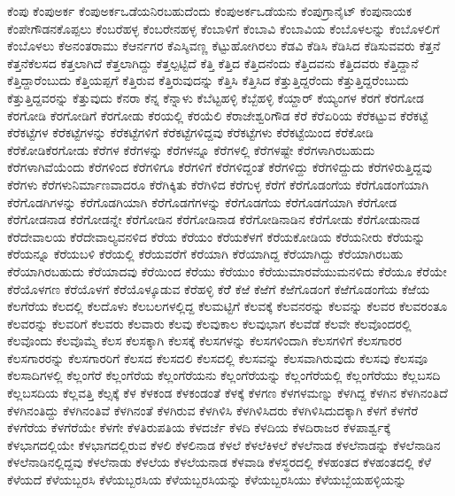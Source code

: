 {ಕೆಂಪು
ಕೆಂಪುಅರ್ಕ
ಕೆಂಪುಅರ್ಕಒಡೆಯನಿರಬಹುದೆಂದು
ಕೆಂಪುಅರ್ಕಒಡೆಯನು
ಕೆಂಪುಗ್ರಾನೈಟ್
ಕೆಂಪುನಾಯಕ
ಕೆಂಪೇಗೌಡನಕೊಪ್ಪಲು
ಕೆಂಬರೆಹಳ್ಳ
ಕೆಂಬರೇನಹಳ್ಳ
ಕೆಂಬಾಳಿಗೆ
ಕೆಂಬಾವಿ
ಕೆಂಬಾವಿಯ
ಕೆಂಬೊಳಲನ್ನು
ಕೆಂಬೊಳಲಿಗೆ
ಕೆಂಬೊಳಲು
ಕೆಅನಂತರಾಮು
ಕೆಆರ್ನಗರ
ಕೆಎಸ್ಶಿವಣ್ಣ
ಕೆಟ್ಟುಹೋಗಿರಲು
ಕೆಡವಿ
ಕೆಡಿಸಿ
ಕೆಡಿಸಿದ
ಕೆಡಿಸುವವರು
ಕೆತ್ತನೆ
ಕೆತ್ತನೆಕೆಲಸದ
ಕೆತ್ತಲಾಗಿದೆ
ಕೆತ್ತಲಾಗಿದ್ದು
ಕೆತ್ತಲ್ಪಟ್ಟಿದೆ
ಕೆತ್ತಿ
ಕೆತ್ತಿದ
ಕೆತ್ತಿದನೆಂದು
ಕೆತ್ತಿದವನು
ಕೆತ್ತಿದವರು
ಕೆತ್ತಿದ್ದಾನೆ
ಕೆತ್ತಿದ್ದಾರೆಂಬುದು
ಕೆತ್ತಿಯಪ್ಪಗೆ
ಕೆತ್ತಿರುವ
ಕೆತ್ತಿರುವುದನ್ನು
ಕೆತ್ತಿಸಿ
ಕೆತ್ತಿಸಿದ
ಕೆತ್ತುತ್ತಿದ್ದರೆಂದು
ಕೆತ್ತುತ್ತಿದ್ದರೆಂಬುದು
ಕೆತ್ತುತ್ತಿದ್ದವರನ್ನು
ಕೆತ್ತುವುದು
ಕೆನರಾ
ಕೆನ್ನ
ಕೆನ್ನಾಳು
ಕೆಬೆಟ್ಟಹಳ್ಳಿ
ಕೆಬ್ಬೆಹಳ್ಳಿ
ಕೆಯ್ದಾರ್
ಕೆಯ್ಯಂಗಳ
ಕೆರಗೆ
ಕೆರಗೋಡ
ಕೆರಗೋಡಿ
ಕೆರಗೋಡಿಗೆ
ಕೆರಗೋಡು
ಕೆರಯಲ್ಲಿ
ಕೆರಯೆಲಿ
ಕೆರಾಜೇಶ್ವರಿಗೌಡ
ಕೆರೆ
ಕೆರೆಏರಿಯ
ಕೆರೆಕಟ್ಟುವ
ಕೆರೆಕಟ್ಟೆ
ಕೆರೆಕಟ್ಟೆಗಳ
ಕೆರೆಕಟ್ಟೆಗಳನ್ನು
ಕೆರೆಕಟ್ಟೆಗಳಿಗೆ
ಕೆರೆಕಟ್ಟೆಗಳಿದ್ದವು
ಕೆರೆಕಟ್ಟೆಗಳು
ಕೆರೆಕಟ್ಟೆಯಿಂದ
ಕೆರೆಕೋಡಿ
ಕೆರೆಕೋಡಿಕೆರಗೋಡು
ಕೆರೆಗಳ
ಕೆರೆಗಳನ್ನು
ಕೆರೆಗಳನ್ನೂ
ಕೆರೆಗಳಲ್ಲಿ
ಕೆರೆಗಳಷ್ಟೇ
ಕೆರೆಗಳಾಗಿರಬಹುದು
ಕೆರೆಗಳಾಗಿವೆಯೆಂದು
ಕೆರೆಗಳಿಂದ
ಕೆರೆಗಳಿಗೂ
ಕೆರೆಗಳಿಗೆ
ಕೆರೆಗಳಿದ್ದಂತೆ
ಕೆರೆಗಳಿದ್ದು
ಕೆರೆಗಳಿದ್ದುದು
ಕೆರೆಗಳಿರುತ್ತಿದ್ದವು
ಕೆರೆಗಳು
ಕೆರೆಗಳುನಿರ್ಮಾಣವಾದರೂ
ಕೆರೆಗಿಕ್ಕಿತು
ಕೆರೆಗಿಳಿದ
ಕೆರೆಗುಳ್ಳ
ಕೆರೆಗೆ
ಕೆರೆಗೊಡಂಗೆಯ
ಕೆರೆಗೊಡಂಗೆಯಾಗಿ
ಕೆರೆಗೊಡಗಿಗಳನ್ನು
ಕೆರೆಗೊಡಗಿಯಾಗಿ
ಕೆರೆಗೊಡಗೆಗಳನ್ನು
ಕೆರೆಗೊಡಗೆಯ
ಕೆರೆಗೊಡಗೆಯಾಗಿ
ಕೆರೆಗೋಡ
ಕೆರೆಗೋಡನಾಡ
ಕೆರೆಗೋಡನ್ನೇ
ಕೆರೆಗೋಡಿನ
ಕೆರೆಗೋಡಿನಾಡ
ಕೆರೆಗೋಡಿನಾಡಿನ
ಕೆರೆಗೋಡು
ಕೆರೆಗೋಡುನಾಡ
ಕೆರೆದೇವಾಲಯ
ಕೆರೆದೇವಾಲ್ಯವನಳಿದ
ಕೆರೆಯ
ಕೆರೆಯಂ
ಕೆರೆಯಕೆಳಗೆ
ಕೆರೆಯಕೋಡಿಯ
ಕೆರೆಯನೀರು
ಕೆರೆಯನ್ನು
ಕೆರೆಯನ್ನೂ
ಕೆರೆಯಬಳಿ
ಕೆರೆಯಲ್ಲಿ
ಕೆರೆಯವರೆಗೆ
ಕೆರೆಯಾಗಿ
ಕೆರೆಯಾಗಿದ್ದ
ಕೆರೆಯಾಗಿದ್ದು
ಕೆರೆಯಾಗಿರಬಹು
ಕೆರೆಯಾಗಿರಬಹುದು
ಕೆರೆಯಾದವು
ಕೆರೆಯಿಂದ
ಕೆರೆಯು
ಕೆರೆಯುಂ
ಕೆರೆಯುಮಾರವೆಯುಮನಳಿದು
ಕೆರೆಯೂ
ಕೆರೆಯೇ
ಕೆರೆಯೊಳಗಣ
ಕೆರೆಯೊಳಗೆ
ಕೆರೆಯೊಳ್ಕೂಡುವ
ಕೆರೆಹಳ್ಳಿ
ಕೆರೆೆ
ಕೆಱೆ
ಕೆಱೆಗೆ
ಕೆಱೆಗೊಡಂಗೆ
ಕೆಱೆಗೊಡಂಗೆಯ
ಕೆಱೆಯ
ಕೆಲಗೆರೆಯ
ಕೆಲದಲ್ಲಿ
ಕೆಲದೊಳು
ಕೆಲಬಲಗಳಲ್ಲಿದ್ದ
ಕೆಲಮಟ್ಟಿಗೆ
ಕೆಲವಕ್ಕೆ
ಕೆಲವನರನ್ನು
ಕೆಲವನ್ನು
ಕೆಲವರ
ಕೆಲವರಂತೂ
ಕೆಲವರನ್ನು
ಕೆಲವರಿಗೆ
ಕೆಲವರು
ಕೆಲವಾರು
ಕೆಲವು
ಕೆಲವುಕಾಲ
ಕೆಲವುಭಾಗ
ಕೆಲವೆಡೆ
ಕೆಲವೇ
ಕೆಲವೊಂದರಲ್ಲಿ
ಕೆಲವೊಂದು
ಕೆಲವೊಮ್ಮೆ
ಕೆಲಸ
ಕೆಲಸಕ್ಕಾಗಿ
ಕೆಲಸಕ್ಕೆ
ಕೆಲಸಗಳನ್ನು
ಕೆಲಸಗಳಿಂದಾಗಿ
ಕೆಲಸಗಳಿಗೆ
ಕೆಲಸಗಾರರ
ಕೆಲಸಗಾರರನ್ನು
ಕೆಲಸಗಾರರಿಗೆ
ಕೆಲಸದ
ಕೆಲಸದಲಿ
ಕೆಲಸದಲ್ಲಿ
ಕೆಲಸವನ್ನು
ಕೆಲಸವಾಗಿರುವುದು
ಕೆಲಸವು
ಕೆಲಸವೂ
ಕೆಲಸಾದಿಗಳಲ್ಲಿ
ಕೆಲ್ಲಂಗೆರೆ
ಕೆಲ್ಲಂಗೆರೆಯ
ಕೆಲ್ಲಂಗೆರೆಯನು
ಕೆಲ್ಲಂಗೆರೆಯನ್ನು
ಕೆಲ್ಲಂಗೆರೆಯಲ್ಲಿ
ಕೆಲ್ಲಂಗೆರೆಯು
ಕೆಲ್ಲಬಸದಿ
ಕೆಲ್ಲಬಸದಿಯ
ಕೆಲ್ಲವತ್ತಿ
ಕೆಲ್ಸಕ್ಕೆ
ಕೆಳ
ಕೆಳಕಂಡ
ಕೆಳಕಂಡಂತೆ
ಕೆಳಕ್ಕೆ
ಕೆಳಗಣ
ಕೆಳಗಳಮಣ್ನು
ಕೆಳಗಿದ್ದ
ಕೆಳಗಿನ
ಕೆಳಗಿನಂತಿದೆ
ಕೆಳಗಿನಂತಿದ್ದು
ಕೆಳಗಿನಂತಿವೆ
ಕೆಳಗಿನಂತೆ
ಕೆಳಗಿರುವ
ಕೆಳಗಿಳಿಸಿ
ಕೆಳಗಿಳಿಸಿದರು
ಕೆಳಗಿಳಿಸಿದುದಕ್ಕಾಗಿ
ಕೆಳಗೆ
ಕೆಳಗೆರೆ
ಕೆಳಗೆರೆಯ
ಕೆಳಗೆರೆಯೇ
ಕೆಳಗೇ
ಕೆಳತಿರುಪತಿಯ
ಕೆಳದರ್ಜೆ
ಕೆಳದಿ
ಕೆಳದಿಯ
ಕೆಳದಿರಾಜರ
ಕೆಳಪಾರ್ಶ್ವಕ್ಕೆ
ಕೆಳಭಾಗದಲ್ಲಿಯೇ
ಕೆಳಭಾಗದಲ್ಲಿರುವ
ಕೆಳಲಿ
ಕೆಳಲಿನಾಡ
ಕೆಳಲೆ
ಕೆಳಲೆಕಿಳಲೆ
ಕೆಳಲೆನಾಡ
ಕೆಳಲೆನಾಡನ್ನು
ಕೆಳಲೆನಾಡಿನ
ಕೆಳಲೆನಾಡಿನಲ್ಲಿದ್ದವು
ಕೆಳಲೆನಾಡು
ಕೆಳಲೆಯ
ಕೆಳಲೆಯನಾಡ
ಕೆಳವಾಡಿ
ಕೆಳಸ್ಥರದಲ್ಲಿ
ಕೆಳಹಂತದ
ಕೆಳಹಂತದಲ್ಲಿ
ಕೆಳೆ
ಕೆಳೆಯದೆ
ಕೆಳೆಯಬ್ಬರಸಿ
ಕೆಳೆಯಬ್ಬರಸಿಯ
ಕೆಳೆಯಬ್ಬರಸಿಯನ್ನು
ಕೆಳೆಯಬ್ಬರಸಿಯು
ಕೆಳೆಯಬ್ಬೆಯಹಳ್ಳಿಯನ್ನು
}
